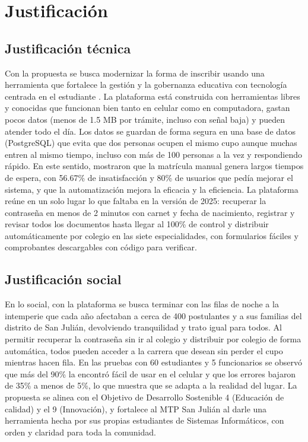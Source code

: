 \section{Justificación}
\label{sec:justificacion}

\subsection{Justificación técnica}

Con la propuesta se busca modernizar la forma de inscribir usando una herramienta que fortalece la gestión y la gobernanza educativa con tecnología centrada en el estudiante \parencite{unesco2023,unesco2024}. La plataforma está construida con herramientas libres y conocidas que funcionan bien tanto en celular como en computadora, gastan pocos datos (menos de 1.5 MB por trámite, incluso con señal baja) y pueden atender todo el día. Los datos se guardan de forma segura en una base de datos (PostgreSQL) que evita que dos personas ocupen el mismo cupo aunque muchas entren al mismo tiempo, incluso con más de 100 personas a la vez y respondiendo rápido. En este sentido, \textcite{leonvelarde2024} mostraron que la matrícula manual genera largos tiempos de espera, con 56.67\% de insatisfacción y 80\% de usuarios que pedía mejorar el sistema, y que la automatización mejora la eficacia y la eficiencia. La plataforma reúne en un solo lugar lo que faltaba en la versión de 2025: recuperar la contraseña en menos de 2 minutos con carnet y fecha de nacimiento, registrar y revisar todos los documentos hasta llegar al 100\% de control y distribuir automáticamente por colegio en las siete especialidades, con formularios fáciles y comprobantes descargables con código para verificar.

\subsection{Justificación social}

En lo social, con la plataforma se busca terminar con las filas de noche a la intemperie que cada año afectaban a cerca de 400 postulantes y a sus familias del distrito de San Julián, devolviendo tranquilidad y trato igual para todos. Al permitir recuperar la contraseña sin ir al colegio y distribuir por colegio de forma automática, todos pueden acceder a la carrera que desean sin perder el cupo mientras hacen fila. En las pruebas con 60 estudiantes y 5 funcionarios se observó que más del 90\% la encontró fácil de usar en el celular y que los errores bajaron de 35\% a menos de 5\%, lo que muestra que se adapta a la realidad del lugar. La propuesta se alinea con el Objetivo de Desarrollo Sostenible 4 (Educación de calidad) y el 9 (Innovación), y fortalece al MTP San Julián al darle una herramienta hecha por sus propias estudiantes de Sistemas Informáticos, con orden y claridad para toda la comunidad.

